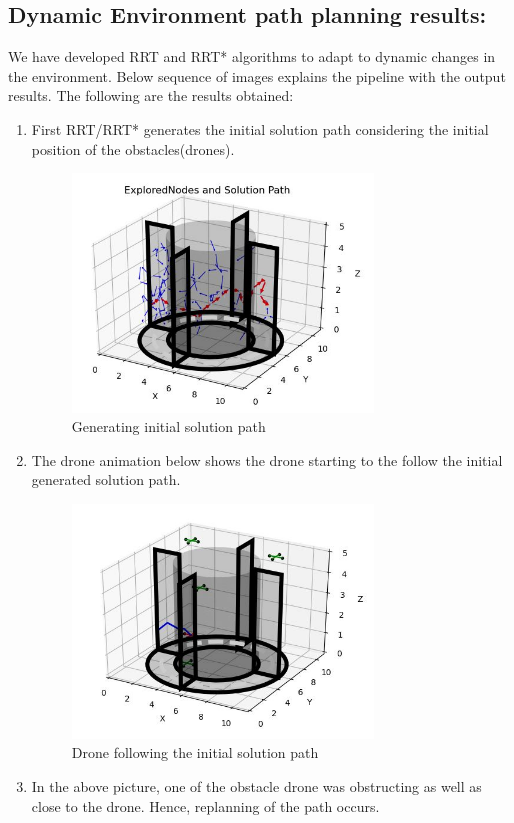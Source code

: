 \documentclass{IEEEtran}
\begin{document}
\subsection{\textbf{Dynamic Environment path planning results:}}
We have developed RRT and RRT* algorithms to adapt to dynamic changes in the environment. Below sequence of images explains the pipeline with the output results. The following are the results obtained:
\begin{enumerate}
\item First RRT/RRT* generates the initial solution path considering the initial position of the obstacles(drones).
\begin{figure}[h]
    \centering
    \includegraphics[width=8cm]{s2}
    \caption{Generating initial solution path}
    \label{fig:Generating initial solution path}
\end{figure}
\item The drone animation below shows the drone starting to the follow the initial generated solution path.
\begin{figure}[h]
    \centering
    \includegraphics[width=8cm]{s1}
    \caption{Drone following the initial solution path}
    \label{fig:Drone following the initial solution path}
\end{figure}
\item In the above picture, one of the obstacle drone was obstructing as well as close to the drone. Hence, replanning of the path occurs.

\end{enumerate}
\end{document}

